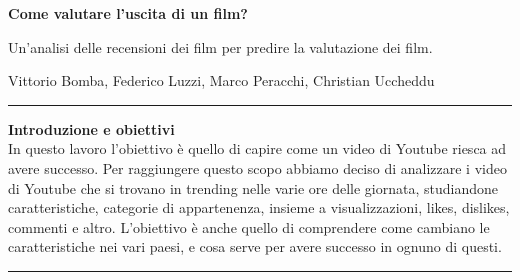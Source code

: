 \documentclass[10pt, a4paper,openany]{article}
\begin{document}
\begin{center}
\huge\textbf{Come valutare l'uscita di un film?}

Un'analisi delle recensioni dei film per predire la valutazione dei film.
\end{center}

\begin{center}
Vittorio Bomba, Federico Luzzi,  Marco Peracchi, Christian Uccheddu
\end{center}

\hrule
\vspace{0.3cm}

\begin{center}\textbf{{Introduzione e obiettivi}}
\\

In questo lavoro l'obiettivo è quello di capire come un video di Youtube riesca ad avere successo. Per raggiungere questo scopo abbiamo deciso di analizzare i video di Youtube che si trovano in trending nelle varie ore delle giornata, studiandone caratteristiche, categorie di appartenenza, insieme a visualizzazioni, likes, dislikes, commenti e altro.
L'obiettivo è anche quello di comprendere come cambiano le caratteristiche nei vari paesi, e cosa serve per avere successo in ognuno di questi.

\vspace{0.3cm}
\hrule
\end{center}
\end{document}
